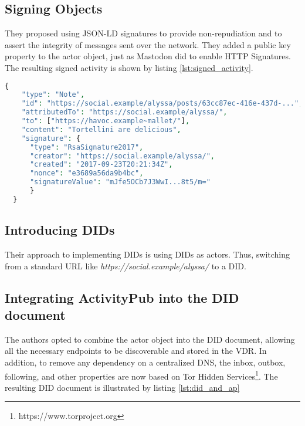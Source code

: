 \subsection*{\textbf{Signing Objects}}
They proposed using JSON-LD signatures to provide non-repudiation and to assert the integrity of messages sent over the network. They added a public key property to the actor object, just as Mastodon did to enable HTTP Signatures. The resulting signed activity is shown by listing \ref{lst:signed_activity}.

\lstset{style=JSONStyle}
\begin{lstlisting}[language=PHP, caption=Note object with JSON-LD Signature. Adapted from \cite{webber_sporny_2017}, label=lst:signed_activity, float=h]
  {
    "type": "Note",
    "id": "https://social.example/alyssa/posts/63cc87ec-416e-437d-...",
    "attributedTo": "https://social.example/alyssa/",
    "to": ["https://havoc.example~mallet/"],
    "content": "Tortellini are delicious",
    "signature": {
      "type": "RsaSignature2017",
      "creator": "https://social.example/alyssa/",
      "created": "2017-09-23T20:21:34Z",
      "nonce": "e3689a56da9b4bc",
      "signatureValue": "mJfe5OCb7J3WwI...8t5/m="
      }
  }
\end{lstlisting}

\subsection*{\textbf{Introducing DIDs}}
Their approach to implementing DIDs is using DIDs as actors. Thus, switching from a standard URL like \emph{https://social.example/alyssa/} to a DID. 

\subsection*{\textbf{Integrating ActivityPub into the DID document}}

The authors opted to combine the actor object into the DID document, allowing all the necessary endpoints to be discoverable and stored in the VDR. In addition, to remove any dependency on a centralized DNS, the inbox, outbox, following, and other properties are now based on Tor Hidden Services\footnote{https://www.torproject.org}. The resulting DID document is illustrated by listing \ref{lst:did_and_ap}

